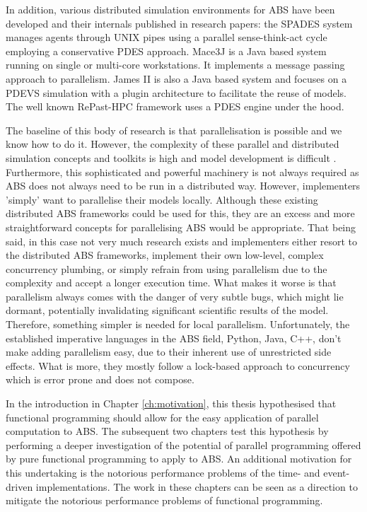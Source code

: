 In addition, various distributed simulation environments for ABS have been developed and their internals published in research papers: the SPADES system \cite{riley_next_2003} manages agents through UNIX pipes using a parallel sense-think-act cycle employing a conservative PDES approach. Mace3J \cite{gasser_mace3j:_2002} is a Java based system running on single or multi-core workstations. It implements a message passing approach to parallelism. James II \cite{himmelspach_plugn_2007} is also a Java based system and focuses on a PDEVS simulation with a plugin architecture to facilitate the reuse of models. The well known RePast-HPC \cite{gorur_repast_2016, minson_distributing_2008} framework uses a PDES engine under the hood. 

The baseline of this body of research is that parallelisation is possible and we know how to do it. However, the complexity of these parallel and distributed simulation concepts and toolkits is high and model development is difficult \cite{abar_agent_2017}. Furthermore, this sophisticated and powerful machinery is not always required as ABS does not always need to be run in a distributed way. However, implementers 'simply' want to parallelise their models locally. Although these existing distributed ABS frameworks could be used for this, they are an excess and more straightforward concepts for parallelising ABS would be appropriate. That being said, in this case not very much research exists and implementers either resort to the distributed ABS frameworks, implement their own low-level, complex concurrency plumbing, or simply refrain from using parallelism due to the complexity and accept a longer execution time. What makes it worse is that parallelism always comes with the danger of very subtle bugs, which might lie dormant, potentially invalidating significant scientific results of the model. Therefore, something simpler is needed for local parallelism. Unfortunately, the established imperative languages in the ABS field, Python, Java, C++, don't make adding parallelism easy, due to their inherent use of unrestricted side effects. What is more, they mostly follow a lock-based approach to concurrency which is error prone and does not compose.

\medskip

In the introduction in Chapter \ref{ch:motivation}, this thesis hypothesised that functional programming should allow for the easy application of parallel computation to ABS. The subsequent two chapters test this hypothesis by performing a deeper investigation of the potential of parallel programming offered by pure functional programming to apply to ABS. An additional motivation for this undertaking is the notorious performance problems of the time- and event-driven implementations. The work in these chapters can be seen as a direction to mitigate the notorious performance problems of functional programming.


